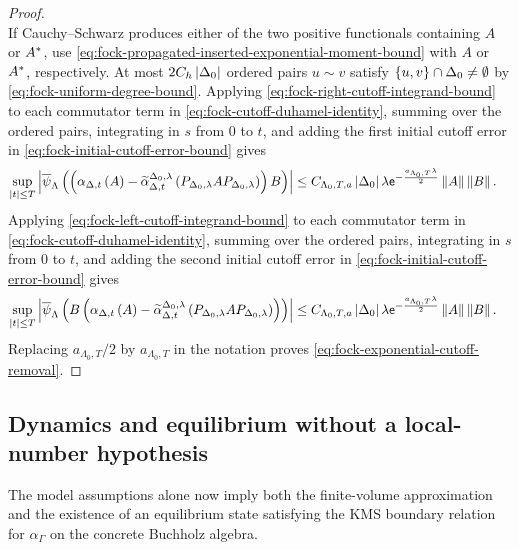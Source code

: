 \documentclass[11pt,a4paper]{article}
\theoremstyle{plain}
\theoremstyle{definition}
\theoremstyle{remark}
\begin{document}
\begin{proof}
\begin{equation}
\end{equation}
If Cauchy--Schwarz produces either of the two positive functionals containing $A$ or $A^{\ast}$,
use \eqref{eq:fock-propagated-inserted-exponential-moment-bound} with $A$ or $A^{\ast}$, respectively.
At most $2C_h\left| \Delta_0 \right|$ ordered pairs $u\sim v$ satisfy $\left\{ u,v \right\}\cap \Delta_0\neq\emptyset$ by
\eqref{eq:fock-uniform-degree-bound}.
Applying \eqref{eq:fock-right-cutoff-integrand-bound} to each commutator term in
\eqref{eq:fock-cutoff-duhamel-identity}, summing over the ordered pairs, integrating in $s$ from $0$ to $t$,
and adding the first initial cutoff error in \eqref{eq:fock-initial-cutoff-error-bound} gives
$$\begin{aligned}
\sup_{\abs{t}\leq T}
\abs{\fun{\oastate[\overline{\psi}_{\Lambda}]}{
\rbk{
\fun{\alpha_{\Delta,t}}{A}
-
\fun{\widetilde{\alpha}_{\Delta,t}^{\Delta_0,\lambda}}{
P_{\Delta_0,\lambda}AP_{\Delta_0,\lambda}}}B}}
& \leq
C_{\Lambda_0,T,a}\abscard{\Delta_0}\lambda
\napiernum^{-\frac{a_{\Lambda_0,T}\lambda}{2}}
\norm{A}\norm{B}.
\end{aligned}$$
Applying \eqref{eq:fock-left-cutoff-integrand-bound} to each commutator term in
\eqref{eq:fock-cutoff-duhamel-identity}, summing over the ordered pairs, integrating in $s$ from $0$ to $t$,
and adding the second initial cutoff error in \eqref{eq:fock-initial-cutoff-error-bound} gives
$$\begin{aligned}
\sup_{\abs{t}\leq T}
\abs{\fun{\oastate[\overline{\psi}_{\Lambda}]}{
B\rbk{
\fun{\alpha_{\Delta,t}}{A}
-
\fun{\widetilde{\alpha}_{\Delta,t}^{\Delta_0,\lambda}}{
P_{\Delta_0,\lambda}AP_{\Delta_0,\lambda}}}}}
& \leq
C_{\Lambda_0,T,a}\abscard{\Delta_0}\lambda
\napiernum^{-\frac{a_{\Lambda_0,T}\lambda}{2}}
\norm{A}\norm{B}.
\end{aligned}$$
Replacing $a_{\Lambda_0,T}/2$ by $a_{\Lambda_0,T}$ in the notation proves
\eqref{eq:fock-exponential-cutoff-removal}.
\end{proof}

\subsection{Dynamics and equilibrium without a local-number hypothesis}\label{dynamics-and-equilibrium-without-a-local-number-hypothesis}

The model assumptions alone now imply both the finite-volume approximation and the existence of an equilibrium state satisfying the KMS boundary relation for \(\alpha_{\Gamma}\) on the concrete Buchholz algebra.
\end{document}

